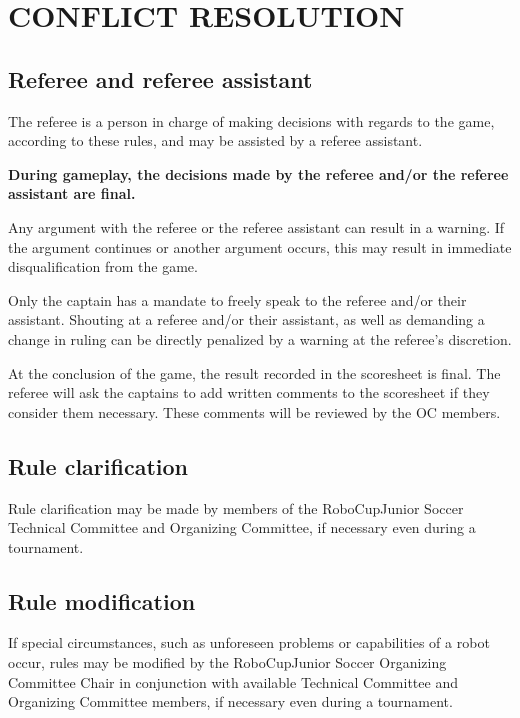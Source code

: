 \documentclass{article}
\begin{document}
\section{CONFLICT RESOLUTION \label{ref-conflict-resolution}}

\subsection{Referee and referee assistant \label{ref-048}}

The referee is a person in charge of making decisions with regards to the game,
according to these rules, and may be assisted by a referee assistant.

\textbf{During gameplay, the decisions made by the referee and/or the referee assistant are final.}

Any argument with the referee or the referee assistant can result in a warning.
If the argument continues or another argument occurs, this may result in
immediate disqualification from the game.

Only the captain has a mandate to freely speak to the referee
and/or their assistant. Shouting at a referee and/or their assistant, as well
as demanding a change in ruling can be directly penalized by a warning at
the referee's discretion.

At the conclusion of the game, the result recorded in the scoresheet is final.
The referee will ask the captains to add written comments to the scoresheet if
they consider them necessary. These comments will be reviewed by the OC
members.

\subsection{Rule clarification \label{ref-049}}

Rule clarification may be made by members of the RoboCupJunior Soccer Technical
Committee and Organizing Committee, if necessary even during a tournament.

\subsection{Rule modification \label{ref-050}}

If special circumstances, such as unforeseen problems or capabilities of a
robot occur, rules may be modified by the RoboCupJunior Soccer Organizing
Committee Chair in conjunction with available Technical Committee and
Organizing Committee members, if necessary even during a tournament.
\end{document}
